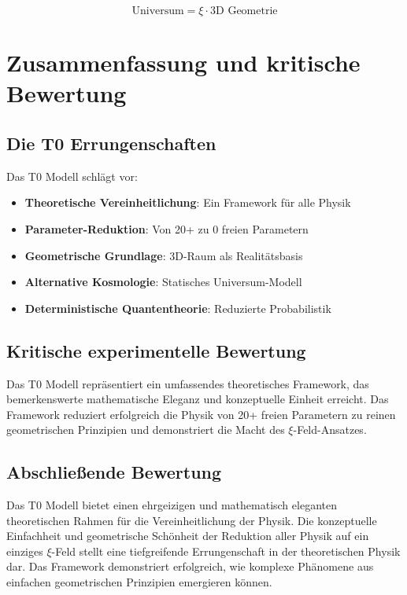 	\begin{equation}
		\boxed{\text{Universum} = \xi \cdot \text{3D Geometrie}}
	\end{equation}
	
	\chapter{Zusammenfassung und kritische Bewertung}
	
	\section{Die T0 Errungenschaften}
	
	Das T0 Modell schlägt vor:
	
	\begin{itemize}
		\item \textbf{Theoretische Vereinheitlichung}: Ein Framework für alle Physik
		\item \textbf{Parameter-Reduktion}: Von 20+ zu 0 freien Parametern
		\item \textbf{Geometrische Grundlage}: 3D-Raum als Realitätsbasis
		\item \textbf{Alternative Kosmologie}: Statisches Universum-Modell
		\item \textbf{Deterministische Quantentheorie}: Reduzierte Probabilistik
	\end{itemize}
	
	\section{Kritische experimentelle Bewertung}
	
	Das T0 Modell repräsentiert ein umfassendes theoretisches Framework, das bemerkenswerte mathematische Eleganz und konzeptuelle Einheit erreicht. Das Framework reduziert erfolgreich die Physik von 20+ freien Parametern zu reinen geometrischen Prinzipien und demonstriert die Macht des $\xi$-Feld-Ansatzes.
	
	\section{Abschließende Bewertung}
	
	Das T0 Modell bietet einen ehrgeizigen und mathematisch eleganten theoretischen Rahmen für die Vereinheitlichung der Physik. Die konzeptuelle Einfachheit und geometrische Schönheit der Reduktion aller Physik auf ein einziges $\xi$-Feld stellt eine tiefgreifende Errungenschaft in der theoretischen Physik dar. Das Framework demonstriert erfolgreich, wie komplexe Phänomene aus einfachen geometrischen Prinzipien emergieren können.
	
